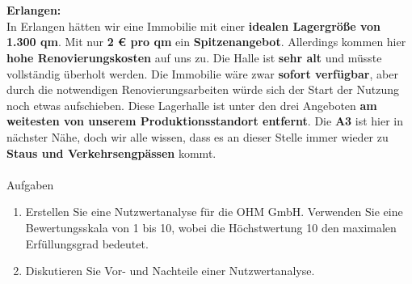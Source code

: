 \\~\\
\textbf{Erlangen:}\\
In Erlangen hätten wir eine Immobilie mit einer \textbf{idealen Lagergröße von 1.300 qm}. Mit nur \textbf{2 € pro qm} ein \textbf{Spitzenangebot}. Allerdings kommen hier \textbf{hohe Renovierungskosten} auf uns zu. Die Halle ist \textbf{sehr alt} und müsste vollständig überholt werden. Die Immobilie wäre zwar \textbf{sofort verfügbar}, aber durch die notwendigen Renovierungsarbeiten würde sich der Start der Nutzung noch etwas aufschieben. Diese Lagerhalle ist unter den drei Angeboten \textbf{am weitesten von unserem Produktionsstandort entfernt}. Die \textbf{A3} ist hier in nächster Nähe, doch wir alle wissen, dass es an dieser Stelle immer wieder zu \textbf{Staus und Verkehrsengpässen} kommt.
\\~\\
Aufgaben
\begin{enumerate}[label=(\alph*)]
  \item Erstellen Sie eine Nutzwertanalyse für die OHM GmbH. Verwenden Sie eine Bewertungsskala von 1 bis 10, wobei die Höchstwertung 10 den maximalen Erfüllungsgrad bedeutet.
  \item Diskutieren Sie Vor- und Nachteile einer Nutzwertanalyse.
\end{enumerate}

